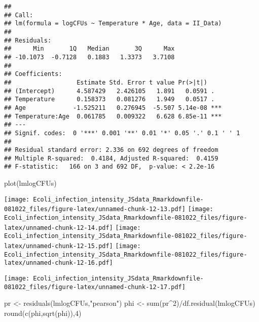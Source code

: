\documentclass[
]{article}
\newenvironment{Shaded}{\begin{snugshade}}{\end{snugshade}}
\newcommand{\DecValTok}[1]{\textcolor[rgb]{0.00,0.00,0.81}{#1}}
\newcommand{\FunctionTok}[1]{\textcolor[rgb]{0.00,0.00,0.00}{#1}}
\newcommand{\NormalTok}[1]{#1}
\newcommand{\OtherTok}[1]{\textcolor[rgb]{0.56,0.35,0.01}{#1}}
\newcommand{\SpecialCharTok}[1]{\textcolor[rgb]{0.00,0.00,0.00}{#1}}
\newcommand{\StringTok}[1]{\textcolor[rgb]{0.31,0.60,0.02}{#1}}
\begin{document}
\begin{verbatim}
## 
## Call:
## lm(formula = logCFUs ~ Temperature * Age, data = II_Data)
## 
## Residuals:
##      Min       1Q   Median       3Q      Max 
## -10.1073  -0.7128   0.1883   1.3373   3.7108 
## 
## Coefficients:
##                  Estimate Std. Error t value Pr(>|t|)    
## (Intercept)      4.587429   2.426105   1.891   0.0591 .  
## Temperature      0.158373   0.081276   1.949   0.0517 .  
## Age             -1.525211   0.276945  -5.507 5.14e-08 ***
## Temperature:Age  0.061785   0.009322   6.628 6.85e-11 ***
## ---
## Signif. codes:  0 '***' 0.001 '**' 0.01 '*' 0.05 '.' 0.1 ' ' 1
## 
## Residual standard error: 2.336 on 692 degrees of freedom
## Multiple R-squared:  0.4184, Adjusted R-squared:  0.4159 
## F-statistic:   166 on 3 and 692 DF,  p-value: < 2.2e-16
\end{verbatim}

\begin{Shaded}
\begin{Highlighting}[]
\FunctionTok{plot}\NormalTok{(lmlogCFUs)}
\end{Highlighting}
\end{Shaded}

\texttt{[image: Ecoli\_infection\_intensity\_JSdata\_Rmarkdownfile-081022\_files/figure-latex/unnamed-chunk-12-13.pdf]}
\texttt{[image: Ecoli\_infection\_intensity\_JSdata\_Rmarkdownfile-081022\_files/figure-latex/unnamed-chunk-12-14.pdf]}
\texttt{[image: Ecoli\_infection\_intensity\_JSdata\_Rmarkdownfile-081022\_files/figure-latex/unnamed-chunk-12-15.pdf]}
\texttt{[image: Ecoli\_infection\_intensity\_JSdata\_Rmarkdownfile-081022\_files/figure-latex/unnamed-chunk-12-16.pdf]}

\begin{Shaded}
\end{Shaded}

\texttt{[image: Ecoli\_infection\_intensity\_JSdata\_Rmarkdownfile-081022\_files/figure-latex/unnamed-chunk-12-17.pdf]}

\begin{Shaded}
\begin{Highlighting}[]
\NormalTok{pr }\OtherTok{\textless{}{-}} \FunctionTok{residuals}\NormalTok{(lmlogCFUs,}\StringTok{"pearson"}\NormalTok{)}
\NormalTok{phi }\OtherTok{\textless{}{-}} \FunctionTok{sum}\NormalTok{(pr}\SpecialCharTok{\^{}}\DecValTok{2}\NormalTok{)}\SpecialCharTok{/}\FunctionTok{df.residual}\NormalTok{(lmlogCFUs)}
\FunctionTok{round}\NormalTok{(}\FunctionTok{c}\NormalTok{(phi,}\FunctionTok{sqrt}\NormalTok{(phi)),}\DecValTok{4}\NormalTok{)}
\end{Highlighting}
\end{Shaded}
\end{document}
